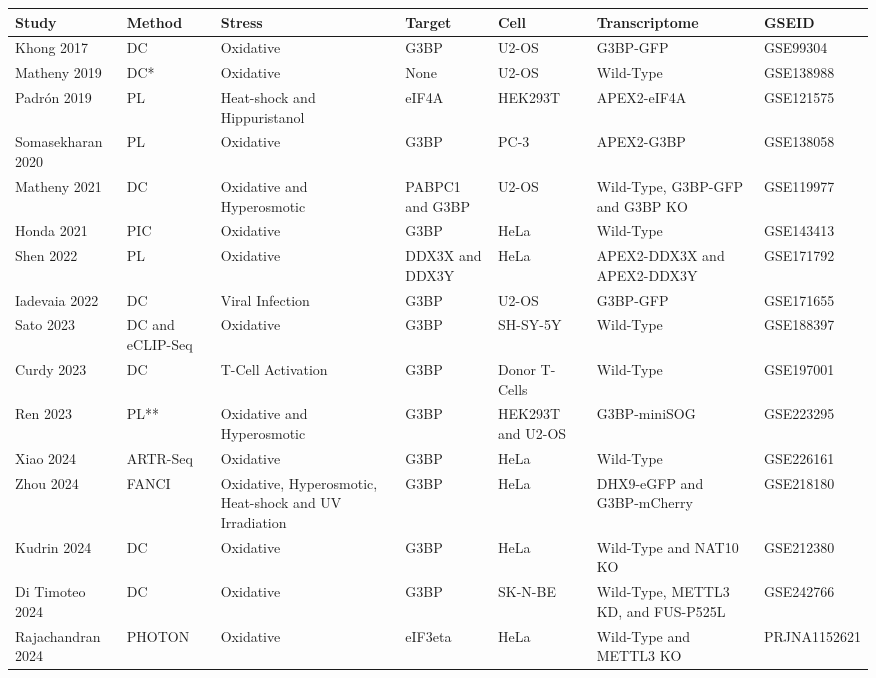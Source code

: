 \begin{table}[H]
	\begin{tabular}{|p{0.16\tablewidth}|p{0.10\tablewidth}|p{0.16\tablewidth}|p{0.10\tablewidth}|p{0.10\tablewidth}|p{0.18\tablewidth}|p{0.16\tablewidth}|}
			\hline
			\textbf{Study} & \textbf{Method} & \textbf{Stress} & \textbf{Target} & \textbf{Cell} & \textbf{Transcriptome} & \textbf{GSEID} \\
			\hline
			Khong 2017 & DC & Oxidative & G3BP & U2-OS & G3BP-GFP & GSE99304 \\
			\hline
			Matheny 2019 & DC* & Oxidative & None & U2-OS & Wild-Type & GSE138988 \\
			\hline
			Padrón 2019 & PL & Heat-shock and Hippuristanol & eIF4A & HEK293T & APEX2-eIF4A & GSE121575 \\
			\hline
			Somasekharan 2020 & PL & Oxidative & G3BP & PC-3 & APEX2-G3BP & GSE138058 \\
			\hline
			Matheny 2021 & DC & Oxidative and Hyperosmotic & PABPC1 and G3BP & U2-OS & Wild-Type, G3BP-GFP and G3BP KO & GSE119977 \\
			\hline
			Honda 2021 & PIC & Oxidative & G3BP & HeLa & Wild-Type & GSE143413 \\
			\hline
			Shen 2022 & PL & Oxidative & DDX3X and DDX3Y & HeLa & APEX2-DDX3X and APEX2-DDX3Y & GSE171792 \\
			\hline
			Iadevaia 2022 & DC & Viral Infection & G3BP & U2-OS & G3BP-GFP & GSE171655 \\
			\hline
			Sato 2023 & DC and eCLIP-Seq & Oxidative & G3BP & SH-SY-5Y & Wild-Type & GSE188397 \\
			\hline
			Curdy 2023 & DC & T-Cell Activation & G3BP & Donor T-Cells & Wild-Type & GSE197001 \\
			\hline
			Ren 2023 & PL** & Oxidative and Hyperosmotic & G3BP & HEK293T and U2-OS & G3BP-miniSOG & GSE223295 \\
			\hline
			Xiao 2024 & ARTR-Seq & Oxidative & G3BP & HeLa & Wild-Type & GSE226161 \\
			\hline
			Zhou 2024 & FANCI & Oxidative, Hyperosmotic, Heat-shock and UV Irradiation & G3BP & HeLa & DHX9-eGFP and G3BP-mCherry & GSE218180 \\
			\hline
			Kudrin 2024 & DC & Oxidative & G3BP & HeLa & Wild-Type and NAT10 KO & GSE212380 \\
			\hline
			Di Timoteo 2024 & DC & Oxidative & G3BP & SK-N-BE & Wild-Type, METTL3 KD, and FUS-P525L & GSE242766 \\
			\hline
			Rajachandran 2024 & PHOTON & Oxidative & eIF3eta & HeLa & Wild-Type and METTL3 KO & PRJNA1152621 \\
			\hline
    \end{tabular}
\label{tab:datasets}
\end{table}


